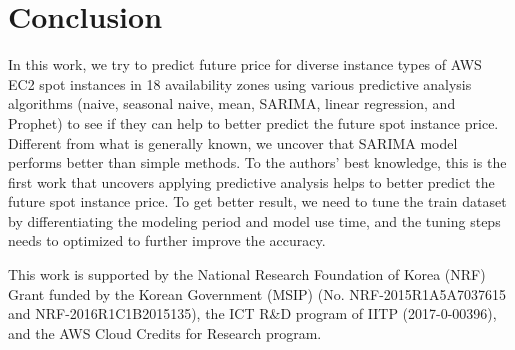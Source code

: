 \documentclass[graybox]{svmult}
\begin{document}
\section{Conclusion}
In this work, we try to predict future price for diverse instance types of AWS EC2 spot instances in 18 availability zones using various predictive analysis algorithms (naive, seasonal naive, mean, SARIMA, linear regression, and Prophet) to see if they can help to better predict the future spot instance price. Different from what is generally known, we uncover that SARIMA model performs better than simple methods. To the authors' best knowledge, this is the first work that uncovers applying predictive analysis helps to better predict the future spot instance price. To get better result, we need to tune the train dataset by differentiating the modeling period and model use time, and the tuning steps needs to optimized to further improve the accuracy.  

\begin{acknowledgement}
This work is supported by the National Research Foundation of Korea (NRF) Grant funded by the Korean Government (MSIP) (No. NRF-2015R1A5A7037615 and NRF-2016R1C1B2015135), the ICT R\&D program of IITP (2017-0-00396), and the AWS Cloud Credits for Research program.
\end{acknowledgement}


\end{document}
